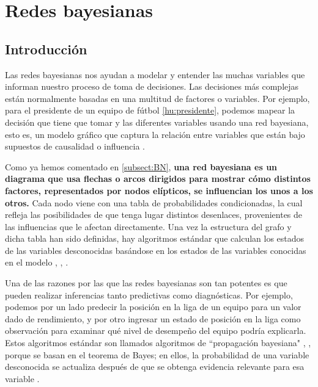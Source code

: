 \section{Redes bayesianas}

\subsection{Introducción}
Las redes bayesianas nos ayudan a modelar y entender las muchas variables que informan nuestro proceso de 
toma de decisiones. Las decisiones más complejas están normalmente basadas en una multitud de factores o 
variables. Por ejemplo, para el presidente de un equipo de fútbol \ref{hu:presidente}, podemos 
mapear la decisión que tiene que tomar y las diferentes variables usando 
una red bayesiana, esto es, un modelo gráfico que captura la relación entre variables que están bajo 
supuestos de causalidad o influencia \cite{things-to-know-BN}.

Como ya hemos comentado en \ref{subsect:BN}, \textbf{una red bayesiana es un diagrama que 
usa flechas o arcos dirigidos para mostrar cómo distintos factores, representados por nodos elípticos, se 
influencian los unos a los otros.} Cada nodo viene con una tabla de probabilidades condicionadas, la cual 
refleja las posibilidades de que tenga lugar distintos desenlaces, provenientes de las influencias que 
le afectan directamente. Una vez la estructura del grafo y dicha tabla han sido definidas, hay algoritmos 
estándar que calculan los estados de las variables desconocidas basándose en los estados de las variables 
conocidas en el modelo \cite{learning-algorithms-BN-comparison}, \cite{BN-achilles-heel}, 
\cite{different-algorithmic-schemes}.

Una de las razones por las que las redes bayesianas son tan potentes es que pueden realizar inferencias 
tanto predictivas como diagnósticas. Por ejemplo, podemos por un lado predecir la posición en la liga de 
un equipo para un valor dado de rendimiento, y por otro ingresar un estado de posición en la 
liga como observación para examinar qué nivel de desempeño del equipo podría explicarla. Estos algoritmos 
estándar son llamados algoritmos de ``propagación bayesiana" \cite{Cano2004}, \cite{more-algorithms}, 
\cite{back-prop} porque se basan en el teorema de Bayes; en ellos, la probabilidad de una variable 
desconocida se actualiza después de que se obtenga evidencia relevante para esa variable \cite{prop-alg}.

